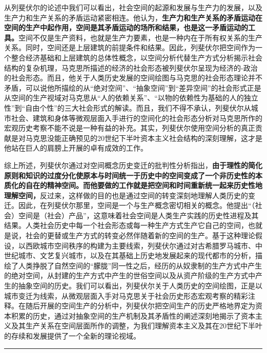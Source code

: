 \documentclass[UTF8, fontset = sourcesans, a4paper, oneside, zihao =
-4, scheme=chinese, no-math, space=true]{ctexbook}
\begin{document}
从列斐伏尔的论述中我们可以看出，社会空间的起源和发展与生产力的发展，以及生产力和生产关系的矛盾运动紧密相连。他认为，\textbf{生产力和生产关系的矛盾运动在空间的生产中起作用，空间是其矛盾运动的场所和结果，也是这一矛盾运动的工具。}空间不仅是生产资料，也就是生产力要素，也是一种内在于所有权关系的生产关系。同时，空间还是上层建筑的前提条件和结果。因此，列斐伏尔把空间作为一个整合经济基础和上层建筑的总体性概念，以空间分析代替生产方式分析揭示社会结构的复杂机理，马克思所描述的经济的社会形态被列斐伏尔呈现为经济的-政治的社会形态。而且，他关于人类历史发展的空间绘图与马克思的社会形态理论并不矛盾，可以说他所描绘的从``绝对空间''、``抽象空间''到``差异空间''的社会形式正是从空间的生产视域对马克思从``人的依赖关系''、``以物的依赖性为基础的人的独立性''到``自由个性''的三大社会形式的解读。而且，我们不得不承认，列斐伏尔从城市社会、建筑和身体等微观层面入手进行的空间化的社会形态分析对马克思所作的宏观历史考察不能不说是一种有益的补充。其实，列斐伏尔使用空间分析的真正贡献是对马克思没能正确预见的20世纪下半叶资本主义社会结构的深刻理解，这才是他站在巨人的肩膀上开展的卓有成效的工作。

综上所述，列斐伏尔通过对空间概念历史变迁的批判性分析指出，\textbf{由于理性的简化原则和知识的过度分化使原本与时间统一于历史中的空间变成了一个非历史性的本质化的自在的精神空间。而他要做的工作就是把空间和时间重新统一起来历史性地理解空间，}反过来，这样做的目的也是通过空间的转变深刻地理解人类历史的变迁。因此，在列斐伏尔那里，空间是一个与生产概念密切相关的概念。他提出``（社会）空间是（社会）产品''，这意味着社会空间是人类生产实践的历史性进程及其结果。人类社会历史中每一个社会形态或每一种生产方式生产它自己的空间，也就是说，社会的更替或生产方式的转变必然伴随着新的空间的生产。基于这种理论假设，以西欧城市空间秩序的构建为主要线索，列斐伏尔通过对古希腊罗马城市、中世纪城市、文艺复兴城市，以及在其基础上历史地发展起来的现代都市的分析，描绘了人类挣脱了自然空间的``朦胧''同一性之后，经历的从奴隶制的生产方式中产生的绝对空间，从封建的生产方式中产生的世俗空间以及从资产阶级的生产方式中产生的抽象空间的历史。我们可以看出，列斐伏尔关于人类历史的空间绘图，正是以城市变迁为线索，从微观层面入手对马克思关于社会历史形态宏观考察的精彩注释。在随后开展的空间生产的分析中，列斐伏尔把空间生产的历史严格地界定为资本积累的历史，通过对抽象空间的生产机制及其矛盾性的阐述深刻地揭示了资本主义及其生产关系在空间层面所作的调整，为我们理解资本主义及其在20世纪下半叶的存续和发展提供了一个全新的理论视域。

\begin{center}\rule{0.5\linewidth}{\linethickness}\end{center}
\end{document}
